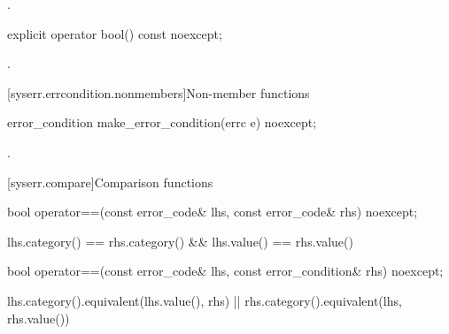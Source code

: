 \begin{itemdescr}
\pnum
\returns {}.
\end{itemdescr}

%
\begin{itemdecl}
explicit operator bool() const noexcept;
\end{itemdecl}

\begin{itemdescr}
\pnum
\returns {}.
\end{itemdescr}

[syserr.errcondition.nonmembers]{Non-member functions}

%
\begin{itemdecl}
error_condition make_error_condition(errc e) noexcept;
\end{itemdecl}

\begin{itemdescr}
\pnum
\returns {}.
\end{itemdescr}

[syserr.compare]{Comparison functions}

%
\begin{itemdecl}
bool operator==(const error_code& lhs, const error_code& rhs) noexcept;
\end{itemdecl}

\begin{itemdescr}
\pnum
\returns
\begin{codeblock}
lhs.category() == rhs.category() && lhs.value() == rhs.value()
\end{codeblock}
\end{itemdescr}

%
%
\begin{itemdecl}
bool operator==(const error_code& lhs, const error_condition& rhs) noexcept;
\end{itemdecl}

\begin{itemdescr}
\pnum
\returns
\begin{codeblock}
lhs.category().equivalent(lhs.value(), rhs) || rhs.category().equivalent(lhs, rhs.value())
\end{codeblock}
\end{itemdescr}

